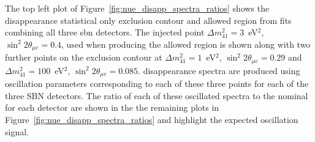 The top left plot of Figure~\ref{fig:nue_disapp_spectra_ratios} shows the \nue disappearance statistical only exclusion contour and allowed region from fits combining all three \gls{sbn} detectors. The injected point \mbox{$\Delta m^2_{41} = 3$~eV$^2$}, $\sin^2{2\theta_{\mu e}} = 0.4$, used when producing the allowed region is shown along with two further points on the exclusion contour at \mbox{$\Delta m^2_{41} = 1$ eV$^2$}, $\sin^2{2\theta_{\mu e}} = 0.29$ and $\Delta m^2_{41} = 100$~eV$^2$, $\sin^2{2\theta_{\mu e}} = 0.085$. \nue disappearance spectra are produced using oscillation parameters corresponding to each of these three points for each of the three SBN detectors. The ratio of each of these oscillated spectra to the nominal for each detector are shown in the the remaining plots in Figure~\ref{fig:nue_disapp_spectra_ratios} and highlight the expected oscillation signal.

